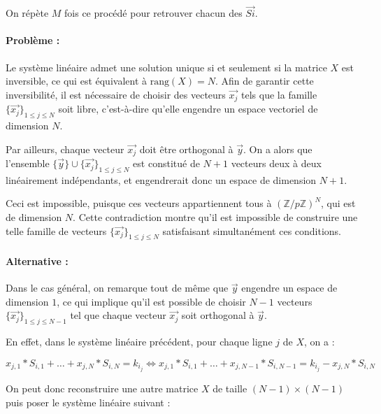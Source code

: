 \documentclass[9pt]{extarticle}
\begin{document}
On répète $M$ fois ce procédé pour retrouver chacun des $\vec{Si}$.

\paragraph{Problème :}

Le système linéaire admet une solution unique si et seulement si la matrice $X$ est inversible, ce qui est équivalent à $\mathrm{rang}(X) = N$. 
Afin de garantir cette inversibilité, il est nécessaire de choisir des vecteurs $\vec{x_j}$ tels que la famille $\{\vec{x_j}\}_{1 \leq j \leq N}$ soit libre, 
c’est-à-dire qu’elle engendre un espace vectoriel de dimension $N$.

Par ailleurs, chaque vecteur $\vec{x_j}$ doit être orthogonal à $\vec{y}$. 
On a alors que l’ensemble $\{\vec{y}\} \cup \{\vec{x_j}\}_{1 \leq j \leq N}$ est constitué de $N+1$ vecteurs deux à deux linéairement indépendants, 
et engendrerait donc un espace de dimension $N+1$.

Ceci est impossible, puisque ces vecteurs appartiennent tous à $(\mathbb{Z}/p\mathbb{Z})^N$, qui est de dimension $N$. Cette contradiction montre qu’il est impossible de construire une telle famille de vecteurs $\{\vec{x_j}\}_{1 \leq j \leq N}$ satisfaisant simultanément ces conditions.

\paragraph{Alternative :}

Dans le cas général, on remarque tout de même que $\vec{y}$ engendre un espace de dimension $1$, ce qui implique qu'il est possible de choisir $N-1$ vecteurs $\{\vec{x_j}\}_{1 \leq j \leq N-1}$ tel que chaque vecteur $\vec{x_j}$ soit orthogonal à $\vec{y}$.

En effet, dans le système linéaire précédent, pour chaque ligne $j$ de $X$, on a :

\[ x_{j,1}*S_{i,1} + \ldots + x_{j,N}*S_{i,N} = k_{i_j} \Leftrightarrow x_{j,1}*S_{i,1} + \ldots + x_{j,N-1}*S_{i,N-1} = k_{i_j} - x_{j,N}*S_{i,N} \]

On peut donc reconstruire une autre matrice $X$ de taille $(N-1) \times (N-1)$ puis poser le système linéaire suivant :
\end{document}
